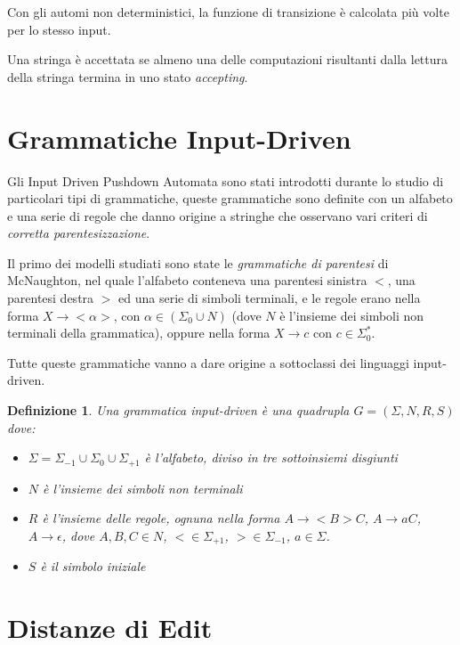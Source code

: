 \documentclass[a4paper,12pt]{report}
\newtheorem{definition}{Definizione}[chapter]
\begin{document}
    Con gli automi non deterministici, la funzione di transizione è calcolata più volte per lo stesso input. 
    
    Una stringa è accettata se almeno una delle computazioni risultanti dalla lettura della stringa termina in uno stato \textit{accepting}.

    \section{Grammatiche Input-Driven}

    Gli Input Driven Pushdown Automata sono stati introdotti durante lo studio di particolari tipi di grammatiche, queste grammatiche sono definite
    con un alfabeto e una serie di regole che danno origine a stringhe che osservano vari criteri di \textit{corretta parentesizzazione}.
    
    Il primo dei modelli studiati sono state le \textit{grammatiche di parentesi} di McNaughton, nel quale l'alfabeto conteneva una parentesi sinistra $<$, una parentesi destra $>$
    ed una serie di simboli terminali, e le regole erano nella forma $X \rightarrow <\alpha>$, con $\alpha \in (\Sigma_0 \cup N)$ (dove $N$ è l'insieme dei simboli non terminali della grammatica), oppure nella forma $X \rightarrow c$ con $c \in \Sigma_0^*$.
    
    Tutte queste grammatiche vanno a dare origine a sottoclassi dei linguaggi input-driven.

    \begin{definition}
        Una grammatica input-driven è una quadrupla $G = (\Sigma, N, R, S)$ dove:
        \begin{itemize}
            \item $\Sigma = \Sigma_{-1} \cup \Sigma_0 \cup \Sigma_{+1}$ è l'alfabeto, diviso in tre sottoinsiemi disgiunti
            \item $N$ è l'insieme dei simboli non terminali
            \item $R$ è l'insieme delle regole, ognuna nella forma $A \rightarrow <B>C$, $A \rightarrow aC$, $A \rightarrow \epsilon$, dove $A, B, C \in N$, $< \in \Sigma_{+1}$, $> \in \Sigma_{-1}$, $a \in \Sigma$.
            \item $S$ è il simbolo iniziale
        \end{itemize}
    \end{definition}

    \section{Distanze di Edit}
\end{document}
